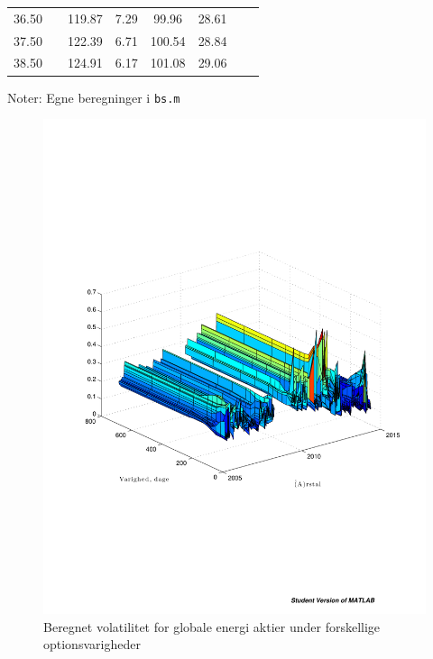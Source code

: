 \documentclass{article}
\begin{document}
\begin{table}[h]
\begin{tabularx}{\linewidth}{cXcccccr}
         36.50    &&    119.87     &     7.29&         99.96    &     28.61 \\
         37.50    &&    122.39      &    6.71&        100.54  &       28.84 \\
         38.50    &&    124.91     &     6.17&        101.08&         29.06 \\
	\bottomrule[1pt]
	\end{tabularx}
	\begin{minipage}{\linewidth}
		\footnotesize{Noter: Egne beregninger i \texttt{bs.m} }
	\end{minipage}
\end{table}	

\begin{figure}
\includegraphics[scale=0.8]{../matlab/figs/implied_vol_curve}
\caption{Beregnet volatilitet for globale energi aktier under forskellige optionsvarigheder}
\label{fig:option_vol_curve}
\end{figure}
\end{document}
